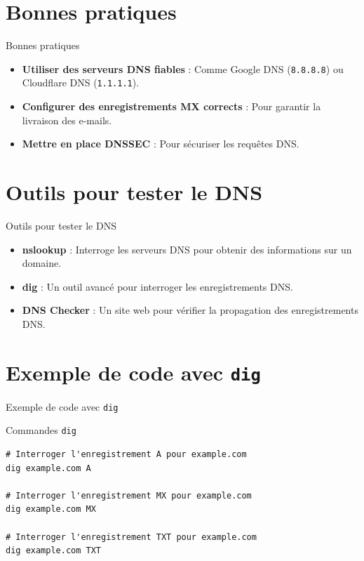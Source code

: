 \documentclass{clbeamer2024}
\begin{document}
	\section{Bonnes pratiques}
	\begin{frame}{Bonnes pratiques}
		\begin{itemize}
			\item \textbf{Utiliser des serveurs DNS fiables} : Comme Google DNS (\texttt{8.8.8.8}) ou Cloudflare DNS (\texttt{1.1.1.1}).
			\item \textbf{Configurer des enregistrements MX corrects} : Pour garantir la livraison des e-mails.
			\item \textbf{Mettre en place DNSSEC} : Pour sécuriser les requêtes DNS.
		\end{itemize}
	\end{frame}
	
	\section{Outils pour tester le DNS}
	\begin{frame}{Outils pour tester le DNS}
		\begin{itemize}
			\item \textbf{nslookup} : Interroge les serveurs DNS pour obtenir des informations sur un domaine.
			\item \textbf{dig} : Un outil avancé pour interroger les enregistrements DNS.
			\item \textbf{DNS Checker} : Un site web pour vérifier la propagation des enregistrements DNS.
		\end{itemize}
	\end{frame}
	
	\section{Exemple de code avec \texttt{dig}}
	\begin{frame}[fragile]{Exemple de code avec \texttt{dig}}
		\begin{exampleblock}{Commandes \texttt{dig}}
			\begin{verbatim}
# Interroger l'enregistrement A pour example.com
dig example.com A
				
# Interroger l'enregistrement MX pour example.com
dig example.com MX
				
# Interroger l'enregistrement TXT pour example.com
dig example.com TXT
			\end{verbatim}
		\end{exampleblock}
	\end{frame}
	
\end{document}
